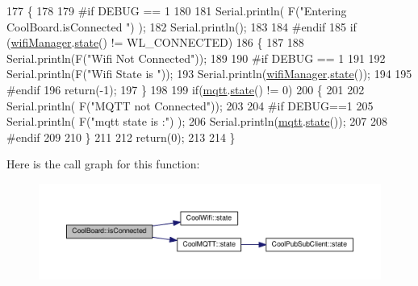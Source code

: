 \begin{DoxyCode}
177 \{
178 
179 \textcolor{preprocessor}{#if DEBUG == 1  }
180 
181     Serial.println( F(\textcolor{stringliteral}{"Entering CoolBoard.isConnected "}) );
182     Serial.println();
183 
184 \textcolor{preprocessor}{#endif}
185     \textcolor{keywordflow}{if} (\hyperlink{class_cool_board_acd88e6003606b47479ebba81e4aceeca}{wifiManager}.\hyperlink{class_cool_wifi_a1c7b4d82a4098d346e7593dce92039fa}{state}() != WL\_CONNECTED)
186     \{
187     
188         Serial.println(F(\textcolor{stringliteral}{"Wifi Not Connected"}));
189 
190 \textcolor{preprocessor}{    #if DEBUG == 1}
191 
192         Serial.println(F(\textcolor{stringliteral}{"Wifi State is "}));
193         Serial.println(\hyperlink{class_cool_board_acd88e6003606b47479ebba81e4aceeca}{wifiManager}.\hyperlink{class_cool_wifi_a1c7b4d82a4098d346e7593dce92039fa}{state}());
194         
195 \textcolor{preprocessor}{    #endif}
196         \textcolor{keywordflow}{return}(-1);
197     \}
198     
199     \textcolor{keywordflow}{if}(\hyperlink{class_cool_board_a2399f44d7c23c1149a335cb3b46d90f1}{mqtt}.\hyperlink{class_cool_m_q_t_t_a5d003307eff78efbd585e42b43b72b6d}{state}() != 0)
200     \{
201         
202         Serial.println( F(\textcolor{stringliteral}{"MQTT not Connected"}));
203 
204 \textcolor{preprocessor}{    #if DEBUG==1}
205         Serial.println( F(\textcolor{stringliteral}{"mqtt state is :"}) );
206         Serial.println(\hyperlink{class_cool_board_a2399f44d7c23c1149a335cb3b46d90f1}{mqtt}.\hyperlink{class_cool_m_q_t_t_a5d003307eff78efbd585e42b43b72b6d}{state}());  
207     
208 \textcolor{preprocessor}{    #endif}
209 
210     \}
211     
212     \textcolor{keywordflow}{return}(0);
213 
214 \}
\end{DoxyCode}
Here is the call graph for this function\+:
\nopagebreak
\begin{figure}[H]
\begin{center}
\leavevmode
\includegraphics[width=350pt]{d7/df9/class_cool_board_ad7442cf4b62c7b0d5bd62a0f75ffc065_cgraph}
\end{center}
\end{figure}
\mbox{\label{class_cool_board_ae6b5e1274d760462290192acea4adca8}} 
